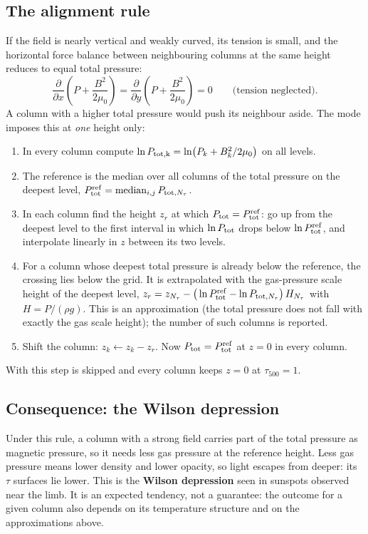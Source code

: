 \subsection{The alignment rule}
If the field is nearly vertical and weakly curved, its tension is small, and the horizontal force balance between
neighbouring columns at the same height reduces to equal total pressure:
\begin{equation}
\frac{\partial}{\partial x}\left(P+\frac{B^2}{2\mu_0}\right)=\frac{\partial}{\partial y}\left(P+\frac{B^2}{2\mu_0}\right)=0
\qquad\text{(tension neglected)} .
\end{equation}
A column with a higher total pressure would push its neighbour aside. The mode imposes this at \emph{one} height only:
\begin{enumerate}
\item In every column compute $\ln P_{\rm tot,k}=\ln\!\big(P_k+B_k^2/2\mu_0\big)$ on all levels.
\item The reference is the median over all columns of the total pressure on the deepest level,
$P_{\rm tot}^{\rm ref}=\operatorname{median}_{i,j}P_{{\rm tot},N_\tau}$.
\item In each column find the height $z_r$ at which $P_{\rm tot}=P_{\rm tot}^{\rm ref}$: go up from the deepest level to the
first interval in which $\ln P_{\rm tot}$ drops below $\ln P_{\rm tot}^{\rm ref}$, and interpolate linearly in $z$ between its
two levels.
\item For a column whose deepest total pressure is already below the reference, the crossing lies below the grid. It is
extrapolated with the gas-pressure scale height of the deepest level,
$z_r=z_{N_\tau}-\big(\ln P_{\rm tot}^{\rm ref}-\ln P_{{\rm tot},N_\tau}\big)\,H_{N_\tau}$ with $H=P/(\rho g)$. This is an
approximation (the total pressure does not fall with exactly the gas scale height); the number of such columns is reported.
\item Shift the column: $z_k\leftarrow z_k-z_r$. Now $P_{\rm tot}=P_{\rm tot}^{\rm ref}$ at $z=0$ in every column.
\end{enumerate}
With  this step is skipped and every column keeps $z=0$ at $\tau_{500}=1$.

\subsection{Consequence: the Wilson depression}
Under this rule, a column with a strong field carries part of the total pressure as magnetic pressure, so it needs less gas
pressure at the reference height. Less gas pressure means lower density and lower opacity, so light escapes from deeper:
its $\tau$ surfaces lie lower. This is the \textbf{Wilson depression} seen in sunspots observed near the limb. It is an
expected tendency, not a guarantee: the outcome for a given column also depends on its temperature structure and on the
approximations above.

